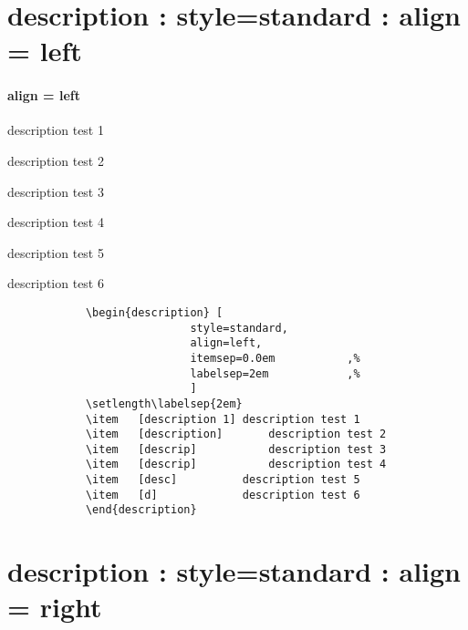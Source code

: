 \documentclass[12pt, a4paper, oneside]{book}
\let\stdsection\section
\renewcommand\section{\newpage\stdsection}
\begin{document}
	\section{description : style=standard : align = left}
			\paragraph{ align = left }
			\begin{description}	[
							style=standard, 
							align=left,
							itemsep=0.0em 			,%
							labelsep=2em 			,%
							]
			\setlength{}
			\item	[description 1]	description test 1
			\item	[description]		description test 2
			\item	[descrip]			description test 3
			\item	[descrip]			description test 4
			\item	[desc]			description test 5
			\item	[d]				description test 6
			\end{description}


		\begin{mdframed}[style=code_document, frametitle={code}]
			\begin{verbatim}
			\begin{description}	[
							style=standard, 
							align=left,
							itemsep=0.0em 			,% 
							labelsep=2em 			,%
							]
			\setlength\labelsep{2em}
			\item	[description 1]	description test 1
			\item	[description]		description test 2
			\item	[descrip]			description test 3
			\item	[descrip]			description test 4
			\item	[desc]			description test 5
			\item	[d]				description test 6
			\end{description}
			\end{verbatim}
		\end{mdframed}



	\section{description : style=standard : align = right}
\end{document}
